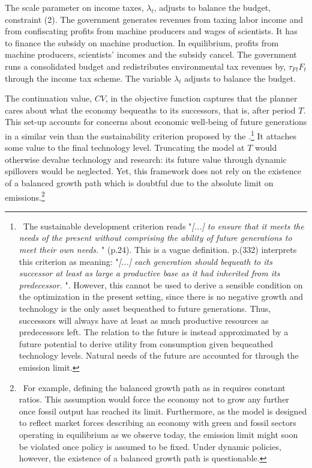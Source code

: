 The scale parameter on income taxes, $\lambda_t$, adjusts to balance the budget, constraint (2).
The government generates revenues from taxing labor income and from confiscating profits from machine producers and wages of scientists. It has to finance the subsidy on machine production. In equilibrium, profits from machine producers, scientists' incomes and the subsidy cancel.
The government runs a consolidated budget and redistributes environmental tax revenues by, $\tau_{Ft}F_t$ through the income tax scheme.
The variable $\lambda_t$ adjusts to balance the budget. 

The continuation value, $CV$, in the objective function captures that the planner cares about what the economy bequeaths to its successors, that is, after period $T$. 
This set-up accounts for concerns about economic well-being of future generations in a similar vein than the sustainability criterion proposed by the \cite{UNSUS}.\footnote{\ The sustainable development criterion reads "\textit{[...] to ensure that it meets the needs of the present without comprising the ability of future generations to meet their own needs.
	}" (p.24). This is a vague definition.  \cite{Dasgupta2021} p.(332) interprets this criterion as meaning: 
	"\textit{[...] each generation should bequeath to its successor at least as large a productive base as it had inherited from its predecessor. }". 
	However, this cannot be used to derive a sensible condition on the optimization in the present setting, since there is no negative growth and technology is the only asset bequeathed to future generations. Thus,
	successors will always have at least as much productive resources as predecessors left. The relation to the future is instead approximated by a future potential to derive utility from consumption given bequeathed technology levels. Natural needs of the future are accounted for through the emission limit. } It attaches some value to the final technology level. Truncating the model at $T$ would otherwise devalue technology and research: its future value through dynamic spillovers would be neglected.
 Yet, this framework does not rely on the existence of a balanced growth path which is doubtful due to the absolute limit on emissions.\footnote{\  For example, defining the balanced growth path as in \cite{Fried2018ClimateAnalysis} requires constant ratios. This assumption would force the economy not to grow any further once fossil output has reached its limit. Furthermore, as the model is designed to reflect market forces describing an economy with green and fossil sectors operating in equilibrium as we observe today, the emission limit might soon be violated once policy is assumed to be fixed. Under dynamic policies, however, the existence of a balanced growth path is questionable.}


